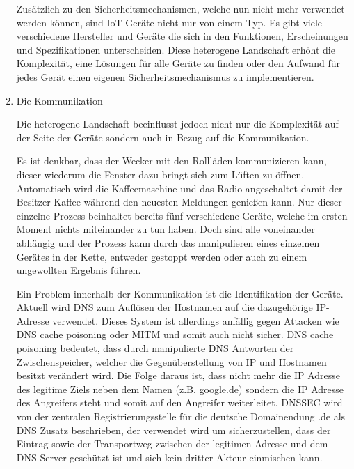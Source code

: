 \begin{enumerate}
            Zusätzlich zu den Sicherheitsmechanismen, welche nun nicht mehr verwendet werden können, sind \ac{IoT} Geräte nicht nur von einem Typ. Es gibt viele verschiedene Hersteller und Geräte die sich in den Funktionen, Erscheinungen und Spezifikationen unterscheiden. Diese heterogene Landschaft erhöht die Komplexität, eine Lösungen für alle Geräte zu finden oder den Aufwand für jedes Gerät einen eigenen Sicherheitsmechanismus zu implementieren.
            
            \item Die Kommunikation
            
            Die heterogene Landschaft beeinflusst jedoch nicht nur die Komplexität auf der Seite der Geräte sondern auch in Bezug auf die Kommunikation.
        
            Es ist denkbar, dass der Wecker mit den Rollläden kommunizieren kann, dieser wiederum die Fenster dazu bringt sich zum Lüften zu öffnen. Automatisch wird die Kaffeemaschine und das Radio angeschaltet damit der Besitzer Kaffee während den neuesten Meldungen genießen kann.
            Nur dieser einzelne Prozess beinhaltet bereits fünf verschiedene Geräte, welche im ersten Moment nichts miteinander zu tun haben. Doch sind alle voneinander abhängig und der Prozess kann durch das manipulieren eines einzelnen Gerätes in der Kette, entweder gestoppt werden oder auch zu einem ungewollten Ergebnis führen.
            
            Ein Problem innerhalb der Kommunikation ist die Identifikation der Geräte. Aktuell wird \ac{DNS} zum Auflösen der Hostnamen auf die dazugehörige IP-Adresse verwendet. Dieses System ist allerdings anfällig gegen Attacken wie DNS cache poisoning oder \ac{MITM} und somit auch nicht sicher.
            DNS cache poisoning bedeutet, dass durch manipulierte DNS Antworten der Zwischenspeicher, welcher die Gegenüberstellung von IP und Hostnamen besitzt verändert wird. Die Folge daraus ist, dass nicht mehr die IP Adresse des legitime Ziels neben dem Namen (z.B. google.de) sondern die IP Adresse des Angreifers steht und somit auf den Angreifer weiterleitet.
            \ac{DNSSEC} wird von der zentralen Registrierungsstelle für die deutsche Domainendung \glqq .de\grqq{} \cite{denic_eg}
            als \ac{DNS} Zusatz beschrieben, der verwendet wird um sicherzustellen, dass der Eintrag sowie der Transportweg zwischen der legitimen Adresse und dem DNS-Server geschützt ist und sich kein dritter Akteur einmischen kann.
        
    \end{enumerate}
